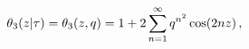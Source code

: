 \[\mathop{\theta_{3}\/}\nolimits\!\left(z\middle|\tau\right)=\mathop{\theta_{3}%
\/}\nolimits\!\left(z,q\right)=1+2\sum\limits_{n=1}^{\infty}q^{n^{2}}\mathop{%
\cos\/}\nolimits\!\left(2nz\right),\]
